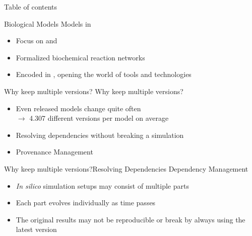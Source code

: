 


\begin{frame}{Table of contents}
	\tableofcontents
\end{frame}
 
\begin{frame}{Biological Models}{}
	{\Large Models in \sysbio}
	\\[2.5em]
	\begin{itemize}
		\item Focus on \sbml \citep{Hucka2003} and \cellml \citep{Cuellar2003}
		\item Formalized biochemical reaction networks
		\item Encoded in \xml, opening the world of \xml tools and technologies
		
	\end{itemize}
\end{frame}

\begin{frame}{Why keep multiple versions?}{}
	{\Large Why keep multiple versions?}
	\\[2.5em]
	\begin{itemize}
		\item Even released models change quite often \\
		$\rightarrow $ 4.307 different versions per model on average
		\item Resolving dependencies without breaking a simulation
		\item Provenance Management
	\end{itemize}
\end{frame}

\begin{frame}{Why keep multiple versions?}{Resolving Dependencies}
	{\Large Dependency Management}
	\\[2.5em]
	\begin{itemize}
		\item \emph{In silico} simulation setups may consist of multiple parts \citep{Waltemath2013}
		\item Each part evolves individually as time passes
		\item The original results may not be reproducible or break by always using the latest version
	\end{itemize}
\end{frame}

